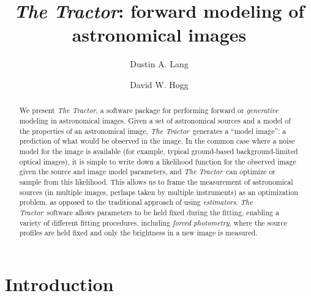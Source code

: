 \documentclass[modern, linenumbers]{aastex631}
\newcommand{\thetractor}{\emph{The Tractor}}
\begin{document}
\title{\emph{The Tractor}: forward modeling of astronomical images}

\author[0000-0002-1172-0754]{Dustin A. Lang}

\author[0000-0003-2866-9403]{David W. Hogg}

\begin{abstract}
  We present \thetractor, a software package for performing forward or
  \emph{generative} modeling in astronomical images.  Given a set of
  astronomical sources and a model of the properties of an
  astronomical image, \thetractor\ generates a ``model image'': a
  prediction of what would be observed in the image.  In the common
  case where a noise model for the image is available (for example,
  typical ground-based background-limited optical images), it is
  simple to write down a likelihood function for the observed image
  given the source and image model parameters, and \thetractor\ can
  optimize or sample from this likelihood.  This allows us to frame
  the measurement of astronomical sources (in multiple images, perhaps
  taken by multiple instruments) as an optimization problem, as
  opposed to the traditional approach of using \emph{estimators}.
  \thetractor\ software allows parameters to be held fixed during the
  fitting, enabling a variety of different fitting procedures,
  including \emph{forced photometry}, where the source profiles are
  held fixed and only the brightness in a new image is measured.
\end{abstract}


\section{Introduction} \label{sec:intro}
\end{document}
